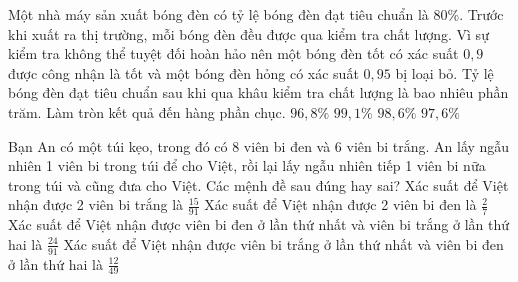 \begin{ex}%
    Một nhà máy sản xuất bóng đèn có tỷ lệ bóng đèn đạt tiêu chuẩn là $80\%$. Trước khi xuất ra thị trường, mỗi bóng đèn đều được qua kiểm tra chất lượng. Vì sự kiểm tra không thể tuyệt đối hoàn hảo nên một bóng đèn tốt có xác suất $0,9$ được công nhận là tốt và một bóng đèn hỏng có xác suất $0,95$ bị loại bỏ. Tỷ lệ bóng đèn đạt tiêu chuẩn sau khi qua khâu kiểm tra chất lượng là bao nhiêu phần trăm. Làm tròn kết quả đến hàng phần chục.
    \choice
    {$96,8\%$}
    {$99,1\%$}
    {\True $98,6\%$}
    {$97,6\%$}
\end{ex}
\begin{ex}%
    Bạn An có một túi kẹo, trong đó có 8 viên bi đen và 6 viên bi trắng. An lấy ngẫu nhiên 1 viên bi trong túi để cho Việt, rồi lại lấy ngẫu nhiên tiếp 1 viên bi nữa trong túi và cũng đưa cho Việt. Các mệnh đề sau đúng hay sai?
    \choiceTF
    {\True Xác suất để Việt nhận được 2 viên bi trắng là $\frac{15}{91}$}
    { Xác suất để Việt nhận được 2 viên bi đen là $\frac{2}{7}$}
    {\True Xác suất để Việt nhận được viên bi đen ở lần thứ nhất và viên bi trắng ở lần thứ hai là $\frac{24}{91}$}
    { Xác suất để Việt nhận được viên bi trắng ở lần thứ nhất và viên bi đen ở lần thứ hai là $\frac{12}{49}$}
\end{ex}
